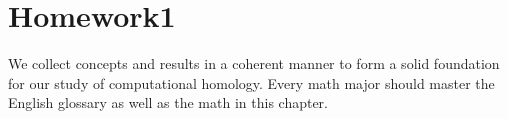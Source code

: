 \documentclass[a4paper]{book}
\makeatletter
\newcommand{\voidenvironment}[1]{%
  \expandafter\providecommand\csname env@#1@save@env\endcsname{}%
  \expandafter\providecommand\csname env@#1@process\endcsname{}%
  \@ifundefined{#1}{}{\RenewEnviron{#1}{}}%
}
\numberwithin{equation}{chapter}
\theoremstyle{definition}
\makeatother
\begin{document}
\pagestyle{empty}

\clearpage

\pagestyle{fancy}
\fancyhead{}

\setcounter{chapter}{-1}




\chapter{Homework1}
We collect concepts and results
 in a coherent manner to form a solid foundation
 for our study of computational homology.
Every math major should master the English glossary
 as well as the math in this chapter.
\end{document}
